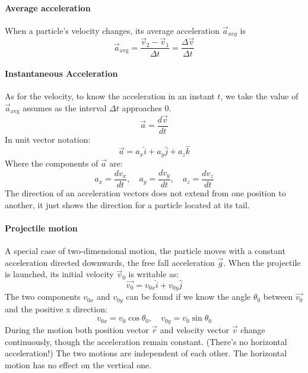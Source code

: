 \documentclass{scrartcl}
\begin{document}
    \paragraph{Average acceleration} When a particle's velocity changes, its average acceleration $\vec{a}_{avg}$ is
    \begin{equation}
        \vec{a}_{\mathrm{avg}} = \frac{\vec{v}_2 - \vec{v}_1}{\Delta t} = \frac{\Delta \vec{v} }{\Delta t}
    \end{equation}
    \paragraph{Instantaneous Acceleration} As for the velocity, to know the acceleration in an instant $t$, we take the value of $\vec{a}_{\mathrm{avg}}$ assumes as the interval $\Delta{t}$ approaches $0$.
    \begin{equation}
        \vec{a} = \frac{d\vec{v}}{dt}
    \end{equation}
    In unit vector notation:
    \begin{equation}
        \vec{a} = a_x \hat{i} + a_y \hat{j} + a_z \hat{k}
    \end{equation}
    Where the components of $\vec{a}$ are:
    \begin{equation}
        a_x = \frac{dv_x}{dt},\quad a_y = \frac{dv_y}{dt},\quad a_z = \frac{dv_z}{dt}
    \end{equation}
    The direction of an acceleration vectors does not extend from one position to another, it just shows the direction for a particle located at its tail. 
    \paragraph{Projectile motion} A special case of two-dimensional motion, the particle moves with a constant acceleration directed downwards, the free fall acceleration $\vec{g}$. When the projectile is launched, its initial velocity $\vec{v}_0$ is writable as: 
    \begin{equation}
        \vec{v_0} = v_{0x} \hat{i} + v_{0y} \hat{j}
    \end{equation}
    The two components $v_{0x}$ and $v_{0y}$ can be found if we know the angle $\theta_0$ between $\vec{v_0}$ and the positive x direction:
    \begin{equation}
        v_{0x} = v_0 \cos \theta_0,\quad v_{0y} = v_0\sin\theta_0
    \end{equation}
    During the motion both position vector $\vec{r}$ and velocity vector $\vec{v}$ change continuously, though the acceleration remain constant. (There's no horizontal acceleration!)
    The two motions are independent of each other. The horizontal motion has no effect on the vertical one.
    
\end{document}
